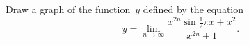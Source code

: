 Draw a graph of the function~$y$ defined by the equation
\[
y = \lim_{n \to \infty} \frac{x^{2n} \sin\frac{1}{2}\pi x + x^{2}}{x^{2n} + 1}.
\]

